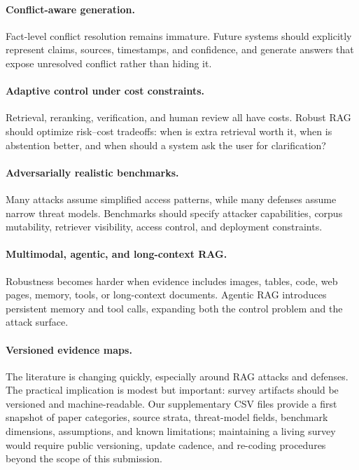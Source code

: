 \documentclass[11pt]{article}
\begin{document}
\paragraph{Conflict-aware generation.}
Fact-level conflict resolution remains immature. Future systems should explicitly represent claims, sources, timestamps, and confidence, and generate answers that expose unresolved conflict rather than hiding it.

\paragraph{Adaptive control under cost constraints.}
Retrieval, reranking, verification, and human review all have costs. Robust RAG should optimize risk--cost tradeoffs: when is extra retrieval worth it, when is abstention better, and when should a system ask the user for clarification?

\paragraph{Adversarially realistic benchmarks.}
Many attacks assume simplified access patterns, while many defenses assume narrow threat models. Benchmarks should specify attacker capabilities, corpus mutability, retriever visibility, access control, and deployment constraints.

\paragraph{Multimodal, agentic, and long-context RAG.}
Robustness becomes harder when evidence includes images, tables, code, web pages, memory, tools, or long-context documents. Agentic RAG introduces persistent memory and tool calls, expanding both the control problem and the attack surface.

\paragraph{Versioned evidence maps.}
The literature is changing quickly, especially around RAG attacks and defenses. The practical implication is modest but important: survey artifacts should be versioned and machine-readable. Our supplementary CSV files provide a first snapshot of paper categories, source strata, threat-model fields, benchmark dimensions, assumptions, and known limitations; maintaining a living survey would require public versioning, update cadence, and re-coding procedures beyond the scope of this submission.
\end{document}
